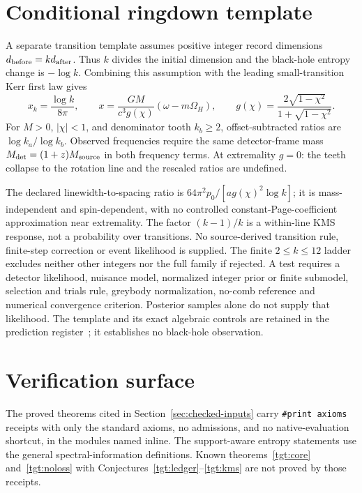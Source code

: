 \documentclass[11pt]{article}
\theoremstyle{remark}
\begin{document}
\section{Conditional ringdown template}
A separate transition template assumes positive integer record dimensions
\(d_{\rm before}=k d_{\rm after}\). Thus \(k\) divides the initial
dimension and the black-hole entropy change is \(-\log k\). Combining
this assumption with the leading small-transition Kerr first law gives
\[
 x_k=\frac{\log k}{8\pi},\qquad
 x=\frac{GM}{c^3g(\chi)}(\omega-m\Omega_H),\qquad
 g(\chi)=\frac{2\sqrt{1-\chi^2}}{1+\sqrt{1-\chi^2}}.
\]
For \(M>0\), \(|\chi|<1\), and denominator tooth \(k_b\ge2\),
offset-subtracted ratios are \(\log k_a/\log k_b\). Observed frequencies
require the same detector-frame mass \(M_{\rm det}=(1+z)M_{\rm source}\)
in both frequency terms. At extremality \(g=0\): the teeth collapse to
the rotation line and the rescaled ratios are undefined.

The declared linewidth-to-spacing ratio is
\(64\pi^2p_0/[a g(\chi)^2\log k]\); it is mass-independent and
spin-dependent, with no controlled constant-Page-coefficient approximation
near extremality. The factor \((k-1)/k\) is a within-line KMS response,
not a probability over transitions. No source-derived transition rule,
finite-step correction or event likelihood is supplied. The finite
\(2\le k\le12\) ladder excludes neither other integers nor the full
family if rejected. A test requires a detector likelihood, nuisance model,
normalized integer prior or finite submodel, selection and trials rule,
greybody normalization, no-comb reference and numerical convergence
criterion. Posterior samples alone do not supply that likelihood.
The template and its exact algebraic controls are retained in the prediction
register~\cite{ophladder}; it establishes no black-hole observation.

\section{Verification surface}

The proved theorems cited in Section~\ref{sec:checked-inputs} carry \texttt{\#print axioms}
receipts with only the standard axioms, no admissions, and no
native-evaluation shortcut, in the modules named inline. The support-aware
entropy statements use the general spectral-information definitions.
Known theorems~\ref{tgt:core} and~\ref{tgt:noloss} with Conjectures~\ref{tgt:ledger}--\ref{tgt:kms} are not proved by those receipts.
\end{document}
